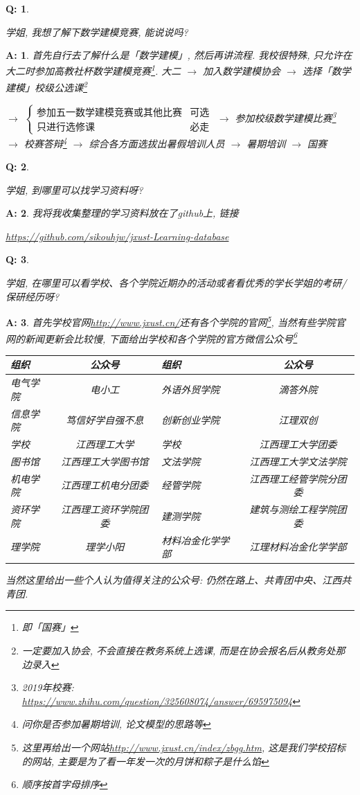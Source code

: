 \documentclass[UTF8]{ctexart}
\theoremstyle{nonumberplain}
\newtheorem{Q}{Q:}
\theoremstyle{nonumberplain}
\newtheorem{A}{A:}
\newcommand{\FAQ}[2]{
    \begin{Q}
        #1
    \end{Q}
    \begin{A}
        #2
    \end{A}
}
\begin{document}
    \FAQ{\hypertarget{9}{学姐, 我想了解下数学建模竞赛, 能说说吗?}}{
        首先自行去了解什么是「数学建模」, 然后再讲流程. 我校很特殊, 只允许在大二时参加高教社杯数学建模竞赛\footnote{即「国赛」}. 大二 $\to$ 加入数学建模协会 $\to$ 选择「数学建模」校级公选课\footnote{一定要加入协会, 不会直接在教务系统上选课, 而是在协会报名后从教务处那边录入}

        $\to$ $\begin{cases}
            \text{参加五一数学建模竞赛或其他比赛} & \text{可选}\\
            \text{只进行选修课} & \text{必走}
        \end{cases}$ $\to$ 参加校级数学建模比赛\footnote{2019年校赛: \url{https://www.zhihu.com/question/325608074/answer/695975094}} $\to$ 校赛答辩\footnote{问你是否参加暑期培训, 论文模型的思路等} $\to$ 综合各方面选拔出暑假培训人员 $\to$ 暑期培训 $\to$ 国赛
    }

    \FAQ{\hypertarget{10}{学姐, 到哪里可以找学习资料呀?}}{
        我将我收集整理的学习资料放在了github上, 链接
        \begin{center}
            \url{https://github.com/sikouhjw/jxust-Learning-database}
        \end{center}
    }

    \FAQ{\hypertarget{11}{学姐, 在哪里可以看学校、各个学院近期办的活动或者看优秀的学长学姐的考研/保研经历呀?}}{
        首先学校官网\url{http://www.jxust.cn/}还有各个学院的官网\footnote{这里再给出一个网站\url{http://www.jxust.cn/index/zbgg.htm}, 这是我们学校招标的网站, 主要是为了看一年发一次的月饼和粽子是什么馅}, 当然有些学院官网的新闻更新会比较慢, 下面给出学校和各个学院的官方微信公众号\footnote{顺序按首字母排序}
        \begin{center}
            \begin{tabularx}{\textwidth}{ZcZc}
                \toprule
                组织 & 公众号 & 组织 & 公众号\\
                \midrule
                电气学院 & 电小工 & 外语外贸学院 & 滴答外院\\
                信息学院 & 笃信好学自强不息 & 创新创业学院 & 江理双创\\
                学校 & 江西理工大学 & 学校 & 江西理工大学团委\\
                图书馆 & 江西理工大学图书馆 & 文法学院 & 江西理工大学文法学院\\
                机电学院 & 江西理工机电分团委 & 经管学院 & 江西理工经管学院分团委\\
                资环学院 & 江西理工资环学院团委 & 建测学院 & 建筑与测绘工程学院团委\\
                理学院 & 理学小阳 & 材料冶金化学学部 & 江理材料冶金化学学部\\
                \bottomrule
            \end{tabularx}
        \end{center}
        当然这里给出一些个人认为值得关注的公众号: 仍然在路上、共青团中央、江西共青团.
    }
\end{document}
